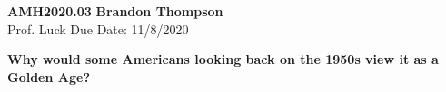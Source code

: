 \noindent
\textbf{AMH2020.03} \hfill \textbf{Brandon Thompson} \\
\normalsize Prof. Luck \hfill Due Date: 11/8/2020 \\

\begin{center}
\textbf{Why would some Americans looking back on the 1950s view it as a Golden Age?}
\end{center}